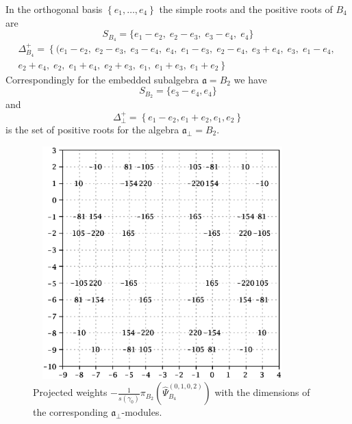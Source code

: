 \documentclass[12pt]{iopart}
\theoremstyle{definition}
\theoremstyle{definition}
\theoremstyle{definition}
\theoremstyle{definition}
\begin{document}
In the orthogonal basis $\left\{e_1,\dots,e_4\right\}$ the simple roots and the positive roots of $B_4$ are
\begin{equation*}
  \label{eq:8}
 S_{B_4}= \{e_1 - e_2,\; e_2 - e_3,\; e_3 - e_4,\; e_4\}
\end{equation*}
\begin{eqnarray*}
  \label{eq:19}
 \Delta^+_{B_4}=\left\{ (e_1 - e_2,\; e_2 - e_3,\; e_3 - e_4,\; e_4,\; e_1 - e_3,\; e_2 - e_4,\; e_3 + e_4,\; e_3,\; e_1 - e_4,\;\right.\\
 \left. e_2 + e_4,\; e_2,\; e_1 + e_4,\; e_2 + e_3,\; e_1,\; e_1 + e_3,\; e_1 + e_2\right\}
\end{eqnarray*}
Correspondingly for the embedded subalgebra $\mathfrak{a}=B_2$ we have
\begin{equation*}
  \label{eq:26}
 S_{B_2}=\{e_3-e_4,e_4\}
\end{equation*}
and
\begin{equation*}
  \label{eq:27}
 \Delta^{+}_{\bot}= \left\{e_1-e_2,e_1+e_2,e_1,e_2\right\}
\end{equation*}
is the set of positive roots for the algebra $\mathfrak{a}_{\bot}=B_2$.
\begin{figure}[t]
  \centering
    \includegraphics[width=100mm,height=90mm]{figure4.eps}
  \caption{Projected weights $-\frac{1}{s(\gamma_0)}\pi_{B_2}\left(\hat \Psi^{(0,1,0,2)}_{B_4}\right)$
  with the dimensions of the corresponding $\mathfrak{a}_{\bot}$-modules.}
  \label{fig:B4B2anom}
\end{figure}
\end{document}
